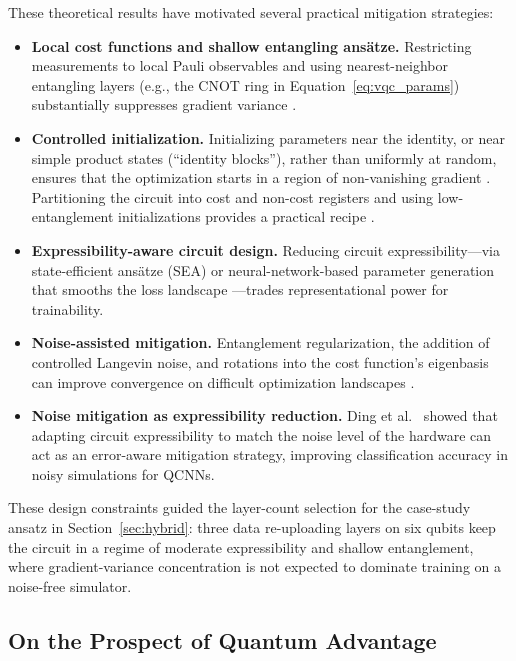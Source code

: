 \documentclass[11pt,a4paper]{article}
\begin{document}
These theoretical results have motivated several practical mitigation
strategies:
\begin{itemize}[leftmargin=1.4em]
  \item \textbf{Local cost functions and shallow entangling ansätze.}
    Restricting measurements to local Pauli observables and using
    nearest-neighbor entangling layers (e.g., the CNOT ring in
    Equation~\ref{eq:vqc_params}) substantially suppresses gradient variance
    \cite{cerezo2021}.
  \item \textbf{Controlled initialization.}  Initializing parameters near the
    identity, or near simple product states (``identity blocks''), rather than
    uniformly at random, ensures that the optimization starts in a region of
    non-vanishing gradient \cite{mcclean2018,patti2021}.  Partitioning the
    circuit into cost and non-cost registers and using low-entanglement
    initializations provides a practical recipe \cite{patti2021}.
  \item \textbf{Expressibility-aware circuit design.}  Reducing circuit
    expressibility---via state-efficient ansätze (SEA) \cite{liu2022sea} or
    neural-network-based parameter generation that smooths the loss landscape
    \cite{zhu2024}---trades representational power for trainability.
  \item \textbf{Noise-assisted mitigation.}  Entanglement regularization, the
    addition of controlled Langevin noise, and rotations into the cost
    function's eigenbasis can improve convergence on difficult optimization
    landscapes \cite{patti2021}.
  \item \textbf{Noise mitigation as expressibility reduction.}  Ding et
    al.~\cite{ding2024} showed that adapting circuit expressibility to match
    the noise level of the hardware can act as an error-aware mitigation
    strategy, improving classification accuracy in noisy simulations for
    QCNNs.
\end{itemize}
These design constraints guided the layer-count selection for the case-study
ansatz in Section~\ref{sec:hybrid}: three data re-uploading layers on six
qubits keep the circuit in a regime of moderate expressibility and shallow
entanglement, where gradient-variance concentration is not expected to
dominate training on a noise-free simulator.

\subsection{On the Prospect of Quantum Advantage}
\label{sec:advantage}
\end{document}
